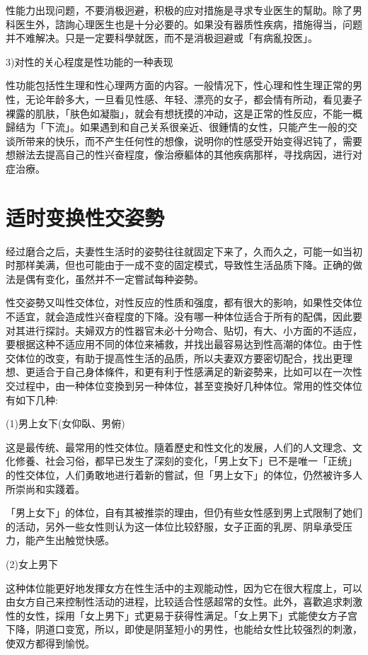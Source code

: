 \documentclass[12pt,UTF8]{ctexbook}
\begin{document}
性能力出现问题，不要消极迥避，积极的应对措施是寻求专业医生的幫助。除了男科医生外，諮詢心理医生也是十分必要的。如果没有器质性疾病，措施得当，问题并不难解决。只是一定要科學就医，而不是消极迴避或「有病亂投医」。

3)对性的关心程度是性功能的一种表现

性功能包括性生理和性心理两方面的内容。一般情况下，性心理和性生理正常的男性，无论年龄多大，一旦看见性感、年轻、漂亮的女子，都会情有所动，看见妻子裸露的肌肤，「肤色如凝脂」，就会有想抚摸的冲动，这是正常的性反应，不能一概歸结为「下流」。如果遇到和自己关系很亲近、很鍾情的女性，只能产生一般的交谈所带来的快乐，而不产生任何性的想像，说明你的性感受开始变得迟钝了，需要想辦法去提高自己的性兴奋程度，像治療軀体的其他疾病那样，寻找病因，进行对症治療。

\section{适时变换性交姿勢}

经过磨合之后，夫妻性生活时的姿勢往往就固定下来了，久而久之，可能一如当初时那样美满，但也可能由于一成不变的固定模式，导致性生活品质下降。正确的做法是偶有变化，虽然并不一定嘗試每种姿勢。

性交姿勢又叫性交体位，对性反应的性质和强度，都有很大的影响，如果性交体位不适宜，就会造成性兴奋程度的下降。没有哪一种体位适合于所有的配偶，因此要对其进行探討。夫婦双方的性器官未必十分吻合、贴切，有大、小方面的不适应，要根据这种不适应用不同的体位来補救，并找出最容易达到性高潮的体位。由于性交体位的改变，有助于提高性生活的品质，所以夫妻双方要密切配合，找出更理想、更适合于自己身体條件，和更有利于性感满足的新姿勢来，比如可以在一次性交过程中，由一种体位变換到另一种体位，甚至变換好几种体位。常用的性交体位有如下几种:

(1)男上女下(女仰臥、男俯)

这是最传统、最常用的性交体位。隨着歷史和性文化的发展，人们的人文理念、文化修養、社会习俗，都早已发生了深刻的变化，「男上女下」已不是唯一「正统」的性交体位，人们勇敢地进行着新的嘗試，但「男上女下」的体位，仍然被许多人所崇尚和实踐着。

「男上女下」的体位，自有其被推崇的理由，但仍有些女性感到男上式限制了她们的活动，另外一些女性则认为这一体位比较舒服，女子正面的乳房、阴阜承受压力，能产生出触觉快感。

(2)女上男下

这种体位能更好地发揮女方在性生活中的主观能动性，因为它在很大程度上，可以由女方自己来控制性活动的进程，比较适合性感超常的女性。此外，喜歡追求刺激性的女性，採用「女上男下」式更易于获得性满足。「女上男下」式能使女方子宫下降，阴道口变宽，所以，即使是阴茎短小的男性，也能给女性比较强烈的刺激，使双方都得到愉悦。
\end{document}
